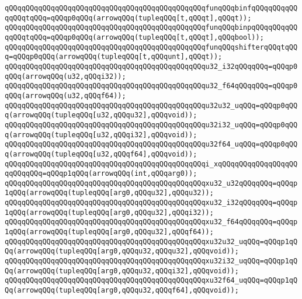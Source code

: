 \verb|qQQqqQQqqQQqqQQqqQQqqQQqqQQqqQQqqQQqqQQqqQQqqQQqfunqQQqbinfqQQqqQQqqQQqqQQqtqQQq=qQQqp0qQQq(arrowqQQq(tupleqQQq[t,qQQqt],qQQqt));|\newline
\verb|qQQqqQQqqQQqqQQqqQQqqQQqqQQqqQQqqQQqqQQqqQQqqQQqfunqQQqbinpqQQqqQQqqQQqqQQqtqQQq=qQQqp0qQQq(arrowqQQq(tupleqQQq[t,qQQqt],qQQqbool));|\newline
\verb|qQQqqQQqqQQqqQQqqQQqqQQqqQQqqQQqqQQqqQQqqQQqqQQqfunqQQqshifterqQQqtqQQq=qQQqp0qQQq(arrowqQQq(tupleqQQq[t,qQQqunt],qQQqt));|\newline
\newline
\verb|qQQqqQQqqQQqqQQqqQQqqQQqqQQqqQQqqQQqqQQqqQQqqQQqu32_i32qQQqqQQq=qQQqp0qQQq(arrowqQQq(u32,qQQqi32));|\newline
\verb|qQQqqQQqqQQqqQQqqQQqqQQqqQQqqQQqqQQqqQQqqQQqqQQqu32_f64qQQqqQQq=qQQqp0qQQq(arrowqQQq(u32,qQQqf64));|\newline
\verb|qQQqqQQqqQQqqQQqqQQqqQQqqQQqqQQqqQQqqQQqqQQqqQQqu32u32_uqQQq=qQQqp0qQQq(arrowqQQq(tupleqQQq[u32,qQQqu32],qQQqvoid));|\newline
\verb|qQQqqQQqqQQqqQQqqQQqqQQqqQQqqQQqqQQqqQQqqQQqqQQqu32i32_uqQQq=qQQqp0qQQq(arrowqQQq(tupleqQQq[u32,qQQqi32],qQQqvoid));|\newline
\verb|qQQqqQQqqQQqqQQqqQQqqQQqqQQqqQQqqQQqqQQqqQQqqQQqu32f64_uqQQq=qQQqp0qQQq(arrowqQQq(tupleqQQq[u32,qQQqf64],qQQqvoid));|\newline
\newline
\verb|qQQqqQQqqQQqqQQqqQQqqQQqqQQqqQQqqQQqqQQqqQQqqQQqi_xqQQqqQQqqQQqqQQqqQQqqQQqqQQq=qQQqp1qQQq(arrowqQQq(int,qQQqarg0));|\newline
\verb|qQQqqQQqqQQqqQQqqQQqqQQqqQQqqQQqqQQqqQQqqQQqqQQqxu32_u32qQQqqQQq=qQQqp1qQQq(arrowqQQq(tupleqQQq[arg0,qQQqu32],qQQqu32));|\newline
\verb|qQQqqQQqqQQqqQQqqQQqqQQqqQQqqQQqqQQqqQQqqQQqqQQqxu32_i32qQQqqQQq=qQQqp1qQQq(arrowqQQq(tupleqQQq[arg0,qQQqu32],qQQqi32));|\newline
\verb|qQQqqQQqqQQqqQQqqQQqqQQqqQQqqQQqqQQqqQQqqQQqqQQqxu32_f64qQQqqQQq=qQQqp1qQQq(arrowqQQq(tupleqQQq[arg0,qQQqu32],qQQqf64));|\newline
\verb|qQQqqQQqqQQqqQQqqQQqqQQqqQQqqQQqqQQqqQQqqQQqqQQqxu32u32_uqQQq=qQQqp1qQQq(arrowqQQq(tupleqQQq[arg0,qQQqu32,qQQqu32],qQQqvoid));|\newline
\verb|qQQqqQQqqQQqqQQqqQQqqQQqqQQqqQQqqQQqqQQqqQQqqQQqxu32i32_uqQQq=qQQqp1qQQq(arrowqQQq(tupleqQQq[arg0,qQQqu32,qQQqi32],qQQqvoid));|\newline
\verb|qQQqqQQqqQQqqQQqqQQqqQQqqQQqqQQqqQQqqQQqqQQqqQQqxu32f64_uqQQq=qQQqp1qQQq(arrowqQQq(tupleqQQq[arg0,qQQqu32,qQQqf64],qQQqvoid));|\newline
